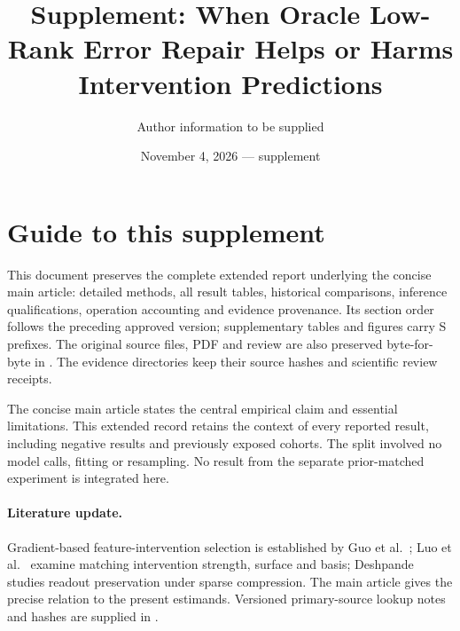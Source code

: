 \documentclass[11pt]{article}
\title{Supplement: When Oracle Low-Rank Error Repair Helps or Harms\\Intervention Predictions}
\author{Author information to be supplied}
\date{November 4, 2026 --- supplement}
\begin{document}
\maketitle
\section*{Guide to this supplement}
This document preserves the complete extended report underlying the concise main article: detailed methods, all result tables, historical comparisons, inference qualifications, operation accounting and evidence provenance. Its section order follows the preceding approved version; supplementary tables and figures carry S prefixes. The original source files, PDF and review are also preserved byte-for-byte in . The evidence directories keep their source hashes and scientific review receipts.

The concise main article states the central empirical claim and essential limitations. This extended record retains the context of every reported result, including negative results and previously exposed cohorts. The split involved no model calls, fitting or resampling. No result from the separate prior-matched experiment is integrated here.

\paragraph{Literature update.} Gradient-based feature-intervention selection is established by Guo et al.~\cite{guo2026}; Luo et al.~\cite{luo2026} examine matching intervention strength, surface and basis; Deshpande~\cite{deshpande2026} studies readout preservation under sparse compression. The main article gives the precise relation to the present estimands. Versioned primary-source lookup notes and hashes are supplied in .
\clearpage

\clearpage
\small


\end{document}
